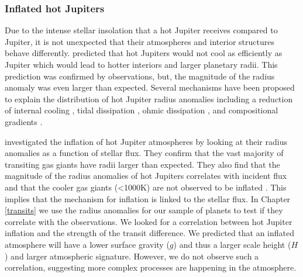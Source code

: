 \subsubsection{Inflated hot Jupiters}

Due to the intense stellar insolation that a hot Jupiter receives compared to Jupiter, it is not unexpected that their atmospheres and interior structures behave differently. \citet{Guillot1996} predicted that hot Jupiters would not cool as efficiently as Jupiter which would lead to hotter interiors and larger planetary radii. This prediction was confirmed by observations, but, the magnitude of the radius anomaly was even larger than expected. Several mechanisms have been proposed to explain the distribution of hot Jupiter radius anomalies including a reduction of internal cooling \citep{Burrows2007a}, tidal dissipation \citep{Bodenheimer2001}, ohmic dissipation \citep{Batygin2010}, and compositional gradients \citep{Chabrier2007, Burrows2007a, Thorngren2016}.

\citet{Thorngren2018} investigated the inflation of hot Jupiter atmospheres by looking at their radius anomalies as a function of stellar flux. They confirm that the vast majority of transiting gas giants have radii larger than expected. They also find that the magnitude of the radius anomalies of hot Jupiters correlates with incident flux and that the cooler gas giants (<1000K) are not observed to be inflated \citep{Miller2011,Demory2011,Laughlin2011}. This implies that the mechanism for inflation is linked to the stellar flux. In Chapter \ref{transits} we use the radius anomalies for our sample of planets to test if they correlate with the \spitzer observations. We looked for a correlation between hot Jupiter inflation and the strength of the \spitzer transit difference. We predicted that an inflated atmosphere will have a lower surface gravity ($g$) and thus a larger scale height ($H$) and larger atmospheric signature. However, we do not observe such a correlation, suggesting more complex processes are happening in the atmosphere.


%



